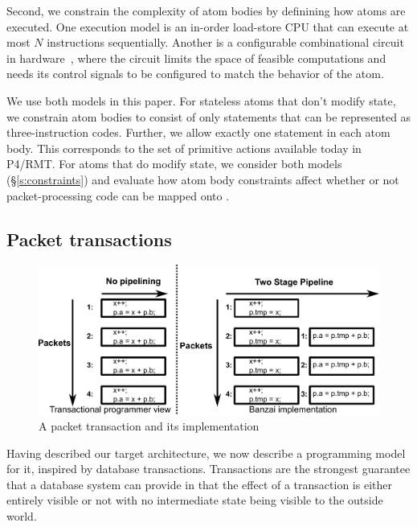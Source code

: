 Second, we constrain the complexity of atom bodies by definining how atoms are
executed. One execution model is an in-order load-store CPU that can execute at
most $N$ instructions sequentially. Another is a configurable combinational
circuit in hardware~\cite{dataflow}, where the circuit limits the space of
feasible computations and needs its control signals to be configured to match
the behavior of the atom.

We use both models in this paper. For stateless atoms that don't modify state,
we constrain atom bodies to consist of only statements that can be represented
as three-instruction codes. Further, we allow exactly one statement in each
atom body. This corresponds to the set of primitive actions available today in
P4/RMT.  For atoms that do modify state, we consider both models
(\S\ref{s:constraints}) and evaluate how atom body constraints affect whether
or not packet-processing code can be mapped onto \absmachine.

\subsection{Packet transactions}
\begin{figure}
  \includegraphics[width=\columnwidth]{spec_vs_impl.pdf}
  \caption{A packet transaction and its implementation}
  \label{fig:trans}
\end{figure}

Having described our target architecture, we now describe a programming model
for it, inspired by database transactions. Transactions are the strongest
guarantee that a database system can provide in that the effect of a
transaction is either entirely visible or not with no intermediate state being
visible to the outside world.

